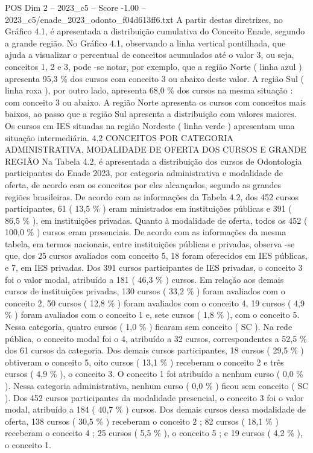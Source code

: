 \begin{textsample}{POS Dim 2 – 2023\_c5 – Score -1.00 – 2023\_c5/enade\_2023\_odonto\_f04d613ff6.txt}
A partir destas diretrizes, no Gráfico 4.1, é apresentada a distribuição cumulativa do Conceito Enade, segundo a grande região.
No Gráfico 4.1, observando a linha vertical pontilhada, que ajuda a visualizar o percentual de conceitos acumulados até o valor 3, ou seja, conceitos 1, 2 e 3, pode -se notar, por exemplo, que a região Norte ( linha azul ) apresenta 95,3 \% dos cursos com conceito 3 ou abaixo deste valor.
A região Sul ( linha roxa ), por outro lado, apresenta 68,0 \% dos cursos na mesma situação : com conceito 3 ou abaixo.
A região Norte apresenta os cursos com conceitos mais baixos, ao passo que a região Sul apresenta a distribuição com valores maiores.
Os cursos em IES situadas na região Nordeste ( linha verde ) apresentam uma situação intermediária. 4.2 CONCEITOS POR CATEGORIA ADMINISTRATIVA, MODALIDADE DE OFERTA DOS CURSOS E GRANDE REGIÃO Na Tabela 4.2, é apresentada a distribuição dos cursos de Odontologia participantes do Enade 2023, por categoria administrativa e modalidade de oferta, de acordo com os conceitos por eles alcançados, segundo as grandes regiões brasileiras.
De acordo com as informações da Tabela 4.2, dos 452 cursos participantes, 61 ( 13,5 \% ) eram ministrados em instituições públicas e 391 ( 86,5 \% ), em instituições privadas.
Quanto à modalidade de oferta, todos os 452 ( 100,0 \% ) cursos eram presenciais.
De acordo com as informações da mesma tabela, em termos nacionais, entre instituições públicas e privadas, observa -se que, dos 25 cursos avaliados com conceito 5, 18 foram oferecidos em IES públicas, e 7, em IES privadas.
Dos 391 cursos participantes de IES privadas, o conceito 3 foi o valor modal, atribuído a 181 ( 46,3 \% ) cursos.
Em relação aos demais cursos de instituições privadas, 130 cursos ( 33,2 \% ) foram avaliados com o conceito 2, 50 cursos ( 12,8 \% ) foram avaliados com o conceito 4, 19 cursos ( 4,9 \% ) foram avaliados com o conceito 1 e, sete cursos ( 1,8 \% ), com o conceito 5.
Nessa categoria, quatro cursos ( 1,0 \% ) ficaram sem conceito ( SC ).
Na rede pública, o conceito modal foi o 4, atribuído a 32 cursos, correspondentes a 52,5 \% dos 61 cursos da categoria.
Dos demais cursos participantes, 18 cursos ( 29,5 \% ) obtiveram o conceito 5, oito cursos ( 13,1 \% ) receberam o conceito 2 e três cursos ( 4,9 \% ), o conceito 3.
O conceito 1 foi atribuído a nenhum curso ( 0,0 \% ).
Nessa categoria administrativa, nenhum curso ( 0,0 \% ) ficou sem conceito ( SC ).
Dos 452 cursos participantes da modalidade presencial, o conceito 3 foi o valor modal, atribuído a 184 ( 40,7 \% ) cursos.
Dos demais cursos dessa modalidade de oferta, 138 cursos ( 30,5 \% ) receberam o conceito 2 ; 82 cursos ( 18,1 \% ) receberam o conceito 4 ; 25 cursos ( 5,5 \% ), o conceito 5 ; e 19 cursos ( 4,2 \% ), o conceito 1.

\end{textsample}
